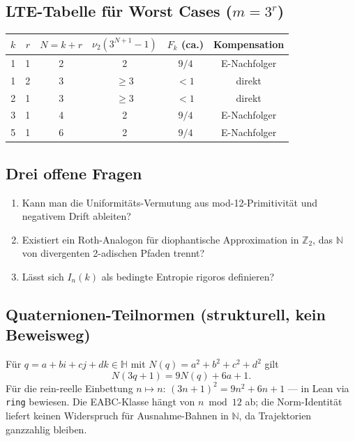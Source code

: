\documentclass[12pt,a4paper]{article}
\newcommand{\vii}{\nu_2}
\newcommand{\N}{\mathbb{N}}
\newcommand{\Ztwo}{\mathbb{Z}_2}
\begin{document}
\subsection{LTE-Tabelle für Worst Cases ($m=3^r$)}

\begin{center}
\small
\begin{tabular}{cccccc}
\toprule
$k$ & $r$ & $N=k+r$ & $\vii(3^{N+1}-1)$ & $F_k$ (ca.) & Kompensation \\
\midrule
1 & 1 & 2 & 2 & $9/4$ & E-Nachfolger \\
1 & 2 & 3 & $\geq 3$ & $<1$ & direkt \\
2 & 1 & 3 & $\geq 3$ & $<1$ & direkt \\
3 & 1 & 4 & 2 & $9/4$ & E-Nachfolger \\
5 & 1 & 6 & 2 & $9/4$ & E-Nachfolger \\
\bottomrule
\end{tabular}
\end{center}

\subsection{Drei offene Fragen}

\begin{enumerate}
  \item Kann man die Uniformitäts-Vermutung aus mod-12-Primitivität
    und negativem Drift ableiten?
  \item Existiert ein Roth-Analogon für diophantische Approximation
    in $\Ztwo$, das $\N$ von divergenten 2-adischen Pfaden trennt?
  \item Lässt sich $I_n(k)$ als bedingte Entropie rigoros definieren?
\end{enumerate}

\subsection{Quaternionen-Teilnormen (strukturell, kein Beweisweg)}

Für $q = a + bi + cj + dk \in \mathbb{H}$ mit $N(q) = a^2+b^2+c^2+d^2$ gilt
\[
  N(3q+1) = 9N(q) + 6a + 1.
\]
Für die rein-reelle Einbettung $n \mapsto n$:
$(3n+1)^2 = 9n^2 + 6n + 1$ --- in Lean via \texttt{ring} bewiesen.
Die EABC-Klasse hängt von $n \bmod 12$ ab; die Norm-Identität liefert
keinen Widerspruch für Ausnahme-Bahnen in $\N$, da Trajektorien
ganzzahlig bleiben.

\end{document}
